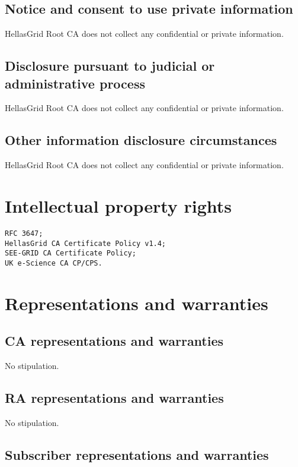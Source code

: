 \documentclass[11pt,a4paper,titlepage]{book}
\begin{document}
\subsection{Notice and consent to use private information}

HellasGrid Root CA does not collect any confidential or private information.

\subsection{Disclosure pursuant to judicial or administrative process}

HellasGrid Root CA does not collect any confidential or private information.

\subsection{Other information disclosure circumstances}

HellasGrid Root CA does not collect any confidential or private information.

\section{Intellectual property rights}

\begin{verbatim}
RFC 3647;
HellasGrid CA Certificate Policy v1.4;
SEE-GRID CA Certificate Policy;
UK e-Science CA CP/CPS.
\end{verbatim}

\section{Representations and warranties}
\subsection{CA representations and warranties}

No stipulation.

\subsection{RA representations and warranties}

No stipulation.

\subsection{Subscriber representations and warranties}
\end{document}
